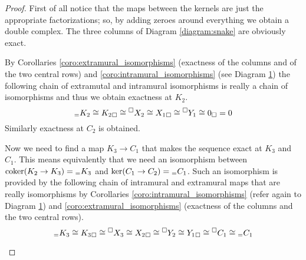 \begin{proof}
  First of all notice that the maps between the kernels are just the appropriate factorizations; so, by adding zeroes around everything we obtain a double complex. The three columns of Diagram \ref{diagram:snake} are obviously exact.

  By Corollaries \ref{coro:extramural_isomorphisms} (exactness of the columns and of the two central rows) and \ref{coro:intramural_isomorphisms} (see Diagram \ref{diagram:extra2}) the following chain of extramutal and intramural isomorphisms is really a chain of isomorphisms and thus we obtain exactness at \(K_2\).
  \begin{equation*}
    {}_={K_2}\cong{K_2}_{\Box}\cong{}^{\Box}{X_2}\cong{X_1}_{\Box}\cong{}^{\Box}{Y_1}\cong{0}_{\Box}=0
  \end{equation*}
  Similarly exactness at \(C_2\) is obtained.

  Now we need to find a map \(K_3\to C_1\) that makes the sequence exact at \(K_3\) and \(C_1\). This means equivalently that we need an isomorphism between \(\operatorname{coker}(K_2\to K_3) = {}_={K_3}\) and \(\ker(C_1\to C_2)= {}_={C_1}\). Such an isomorphism is provided by the following chain of intramural and extramural maps that are really isomorphisms by Corollaries \ref{coro:intramural_isomorphisms} (refer again to Diagram \ref{diagram:extra2}) and \ref{coro:extramural_isomorphisms} (exactness of the columns and the two central rows).
  \begin{equation*}
    {}_={K_3}\cong{K_3}_{\Box}\cong{}^{\Box}{X_3}\cong{X_2}_{\Box}\cong{}^{\Box}{Y_2}\cong{Y_1}_{\Box}\cong{}^{\Box}{C_1}\cong{}_={C_1}
  \end{equation*}

  \begin{figure}[h]
    \begin{center}
      \hspace{2cm}
      \hspace{2cm}
    \end{center}
    \caption{}
    \label{diagram:extra2}
  \end{figure}
\end{proof}
